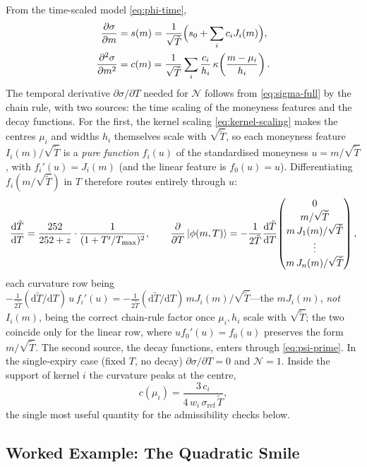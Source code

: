 \documentclass[11pt]{book}
\theoremstyle{plain}
\theoremstyle{definition}
\theoremstyle{remark}
\newcommand{\ket}[1]{\mathinner{\lvert #1 \rangle}}
\newcommand{\mln}{m}                             %
\newcommand{\sref}{\sigma_{\mathrm{ref}}}        %
\newcommand{\dd}{\mathrm{d}}                                  %
\newcommand{\pd}[2]{\frac{\partial #1}{\partial #2}}          %
\newcommand{\pdd}[2]{\frac{\partial^2 #1}{\partial #2^2}}     %
\newcommand{\td}[2]{\frac{\dd #1}{\dd #2}}                    %
\begin{document}
From the time-scaled model \eqref{eq:phi-time},
\begin{align}
\pd{\sigma}{\mln} &= s(\mln)
= \frac{1}{\sqrt{\tilde T}}\Bigl(s_0 + \sum_i c_i J_i(\mln)\Bigr),
\label{eq:dsig-dm}\\
\pdd{\sigma}{\mln} &= c(\mln)
= \frac{1}{\sqrt{\tilde T}}\sum_i \frac{c_i}{h_i}\,
\kappa\!\left(\frac{\mln-\mu_i}{h_i}\right).
\label{eq:d2sig-dm2}
\end{align}
The temporal derivative $\partial\sigma/\partial T$ needed for $\mathcal N$
follows from \eqref{eq:sigma-full} by the chain rule, with two sources: the
time scaling of the moneyness features and the decay functions. For the first,
the kernel scaling \eqref{eq:kernel-scaling} makes the centres $\mu_i$ and
widths $h_i$ themselves scale with $\sqrt{\tilde T}$, so each moneyness feature
$I_i(\mln)/\sqrt{\tilde T}$ is a \emph{pure function} $f_i(u)$ of the
standardised moneyness $u=\mln/\sqrt{\tilde T}$, with $f_i'(u)=J_i(\mln)$ (and
the linear feature is $f_0(u)=u$). Differentiating $f_i(\mln/\sqrt{\tilde T})$
in $T$ therefore routes entirely through $u$:
\[
\td{\tilde T}{T} = \frac{252}{252+z}\cdot\frac{1}{(1+T'/T_{\max})^2},
\qquad
\pd{}{T}\ket{\phi(\mln,T)}
= -\frac{1}{2\tilde T}\td{\tilde T}{T}\!
\begin{pmatrix} 0 \\ \mln/\sqrt{\tilde T} \\ \mln\,J_1(\mln)/\sqrt{\tilde T} \\ \vdots
\\ \mln\,J_n(\mln)/\sqrt{\tilde T} \end{pmatrix},
\]
each curvature row being
$-\tfrac{1}{2\tilde T}(\dd\tilde T/\dd T)\,u\,f_i'(u)
= -\tfrac{1}{2\tilde T}(\dd\tilde T/\dd T)\,\mln J_i(\mln)/\sqrt{\tilde T}$---the
$\mln J_i(\mln)$, \emph{not} $I_i(\mln)$, being the correct chain-rule factor
once $\mu_i,h_i$ scale with $\sqrt{\tilde T}$; the two coincide only for the
linear row, where $u f_0'(u)=f_0(u)$ preserves the form $\mln/\sqrt{\tilde T}$.
The second source, the decay functions, enters through \eqref{eq:psi-prime}. In the single-expiry
case (fixed $T$, no decay) $\partial\sigma/\partial T = 0$ and $\mathcal N = 1$.
Inside the support of kernel $i$ the curvature peaks at the centre,
\begin{equation}\label{eq:max-curvature}
c(\mu_i) = \frac{3\,c_i}{4\,w_i\,\sref\,\tilde T},
\end{equation}
the single most useful quantity for the admissibility checks below.

\subsection{Worked Example: The Quadratic Smile}
\label{sec:quadratic-example}
\end{document}
